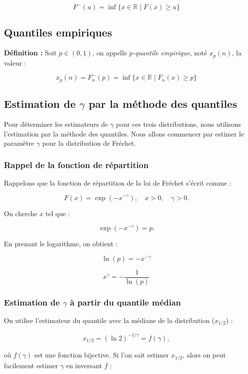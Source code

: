 \documentclass{article}
\begin{document}
\[
F^-(u) = \inf \{ x \in \mathbb{R} \mid F(x) \geq u \}
\]

\subsection{Quantiles empiriques}

\textbf{Définition :} Soit \(p \in (0,1)\), on appelle \textit{\(p\)-quantile empirique}, noté \(x_p(n)\), la valeur :

\[
x_p(n) = F_n^-(p) = \inf \{ x \in \mathbb{R} \mid F_n(x) \geq p \}
\]

\subsection{Estimation de \(\gamma\) par la méthode des quantiles}

Pour déterminer les estimateurs de \(\gamma\) pour ces trois distributions, nous utilisons l'estimation par la méthode des quantiles.  
Nous allons commencer par estimer le paramètre \(\gamma\) pour la distribution de Fréchet.

\subsubsection{Rappel de la fonction de répartition}

Rappelons que la fonction de répartition de la loi de Fréchet s'écrit comme :

\[
F(x) = \exp(-x^{-\gamma}), \quad x > 0, \quad \gamma > 0.
\]

On cherche \(x\) tel que :

\[
\exp(-x^{-\gamma}) = p.
\]

En prenant le logarithme, on obtient :

\[
\ln(p) = -x^{-\gamma}
\]

\[
x^{\gamma} = -\frac{1}{\ln(p)}
\]

\subsubsection{Estimation de \(\gamma\) à partir du quantile médian}

On utilise l'estimateur du quantile avec la médiane de la distribution (\(x_{1/2}\)) :

\[
x_{1/2} = (\ln 2)^{-1/\gamma} = f(\gamma),
\]

où \(f(\gamma)\) est une fonction bijective.  
Si l'on sait estimer \(x_{1/2}\), alors on peut facilement estimer \(\gamma\) en inversant \(f\) :
\end{document}
